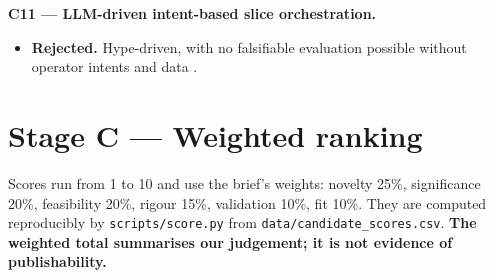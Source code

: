 \textbf{C11 --- LLM-driven intent-based slice orchestration.}

\begin{itemize}
\tightlist
\item
  \textbf{Rejected.} Hype-driven, with no falsifiable evaluation
  possible without operator intents and data
  \citep{zhou2024llmtelecom, boateng2025llm}.
\end{itemize}

\hypertarget{sec:rank}{%
\section{Stage C --- Weighted ranking}\label{sec:rank}}

Scores run from 1 to 10 and use the brief's weights: novelty 25\%,
significance 20\%, feasibility 20\%, rigour 15\%, validation 10\%, fit
10\%. They are computed reproducibly by \texttt{scripts/score.py} from
\texttt{data/candidate\_scores.csv}. \textbf{The weighted total
summarises our judgement; it is not evidence of publishability.}

